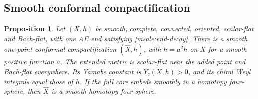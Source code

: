 \documentclass[11pt]{article}
\numberwithin{equation}{section}
\newtheorem{proposition}[theorem]{Proposition}
\theoremstyle{definition}
\theoremstyle{remark}
\begin{document}
\subsection{Smooth conformal compactification}

\begin{proposition}\label{msale:compact}
Let \((X,h)\) be smooth, complete, connected, oriented, scalar-flat
and Bach-flat, with one AE end satisfying \eqref{msale:end-decay}.
There is a smooth one-point conformal compactification
\((\widehat X,\bar h)\), with \(\bar h=a^2h\) on \(X\) for a smooth
positive function \(a\). The extended metric is scalar-flat near
the added point and Bach-flat everywhere. Its Yamabe constant is
\(Y_c(X,h)>0\), and its chiral Weyl integrals equal those of \(h\).
If the full core embeds smoothly in a homotopy four-sphere, then
\(\widehat X\) is a smooth homotopy four-sphere.
\end{proposition}
\end{document}
